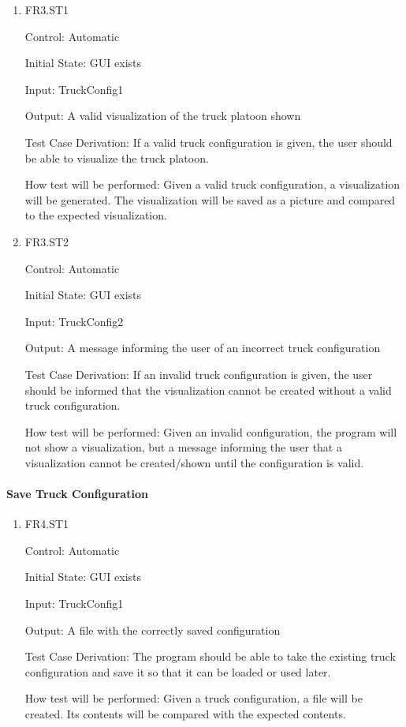 \documentclass[12pt, titlepage]{article}
\begin{document}
\begin{enumerate}

  \item{FR3.ST1\\}

  Control: Automatic

  Initial State: GUI exists

  Input: TruckConfig1

  Output: A valid visualization of the truck platoon shown

  Test Case Derivation: If a valid truck configuration is given, the user should be able to
  visualize the truck platoon.

  How test will be performed: Given a valid truck configuration, a visualization will be generated.
  The visualization will be saved as a picture and compared to the expected visualization.

  \item{FR3.ST2\\}

  Control: Automatic

  Initial State: GUI exists

  Input: TruckConfig2

  Output: A message informing the user of an incorrect truck configuration

  Test Case Derivation: If an invalid truck configuration is given, the user should be informed
  that the visualization cannot be created without a valid truck configuration.

  How test will be performed: Given an invalid configuration, the program will not show
  a visualization, but a message informing the user that a visualization cannot be created/shown
  until the configuration is valid.

\end{enumerate}

\paragraph{Save Truck Configuration}

\begin{enumerate}

  \item{FR4.ST1\\}

  Control: Automatic

  Initial State: GUI exists

  Input: TruckConfig1

  Output: A file with the correctly saved configuration

  Test Case Derivation: The program should be able to take the existing truck configuration and
  save it so that it can be loaded or used later.

  How test will be performed: Given a truck configuration, a file will be created. Its contents
  will be compared with the expected contents.

\end{enumerate}
\end{document}
